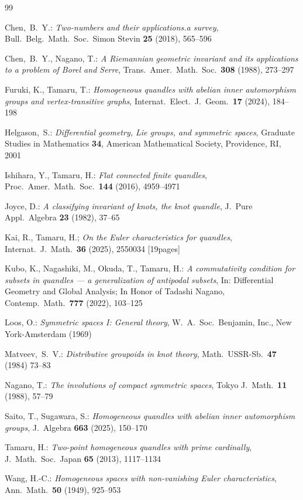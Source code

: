 \documentclass[12pt]{amsart}
\theoremstyle{definition}
\begin{document}
\begin{thebibliography}{99} 

Chen,~B.~Y.: 
\textit{Two-numbers and their applications.a survey}, 
Bull.\ Belg.\ Math.\ Soc.\ Simon Stevin \textbf{25} (2018), 565--596 

Chen,~B.~Y., Nagano, T.: 
\textit{A Riemannian geometric invariant and its applications to a problem of Borel and Serre}, 
Trans.\ Amer.\ Math.\ Soc.\ \textbf{308} (1988), 273--297 

Furuki, K., Tamaru, T.: 
\textit{Homogeneous quandles with abelian inner automorphism groups and vertex-transitive graphs}, 
Internat.\ Elect.\ J.\ Geom.\ \textbf{17} (2024), 184--198 

Helgason,~S.: 
\textit{Differential geometry, Lie groups, and symmetric spaces}, 
Graduate Studies in Mathematics \textbf{34}, American Mathematical Society, Providence, RI, 2001 

Ishihara, Y., Tamaru, H.: 
\textit{Flat connected finite quandles}, 
Proc.\ Amer.\ Math.\ Soc.\ \textbf{144} (2016), 4959--4971 

Joyce, D.: 
\textit{A classifying invariant of knots, the knot quandle}, 
J.\ Pure Appl.\ Algebra \textbf{23} (1982), 37--65 

Kai, R., Tamaru, H.; 
\textit{On the Euler characteristics for quandles}, 
Internat.\ J.\ Math.\ \textbf{36} (2025), 2550034 [19pages] 

Kubo, K., Nagashiki, M., Okuda, T., Tamaru, H.: 
\textit{A commutativity condition for subsets in quandles --- a generalization of antipodal subsets}, 
In: Differential Geometry and Global Analysis; In Honor of Tadashi Nagano, 
Contemp.\ Math.\ \textbf{777} (2022), 103--125 

Loos, O.: 
\textit{Symmetric spaces I: General theory}, 
W.\ A.\ Soc.\ Benjamin, Inc., New York-Amsterdam (1969) 

Matveev,~S.~V.: 
\textit{Distributive groupoids in knot theory}, 
Math.\ USSR-Sb.\ \textbf{47} (1984) 73--83 

Nagano, T.: 
\textit{The involutions of compact symmetric spaces}, 
Tokyo J.\ Math.\ \textbf{11} (1988), 57--79 

Saito, T., Sugawara, S.: 
\textit{Homogeneous quandles with abelian inner automorphism groups}, 
J.\ Algebra \textbf{663} (2025), 150--170 

Tamaru, H.: 
\textit{Two-point homogeneous quandles with prime cardinally}, 
J.\ Math.\ Soc.\ Japan \textbf{65} (2013), 1117--1134 

Wang, H.-C.: 
\textit{Homogeneous spaces with non-vanishing Euler characteristics}, 
Ann.\ Math.\ \textbf{50} (1949), 925--953 

\end{thebibliography}
\end{document}
